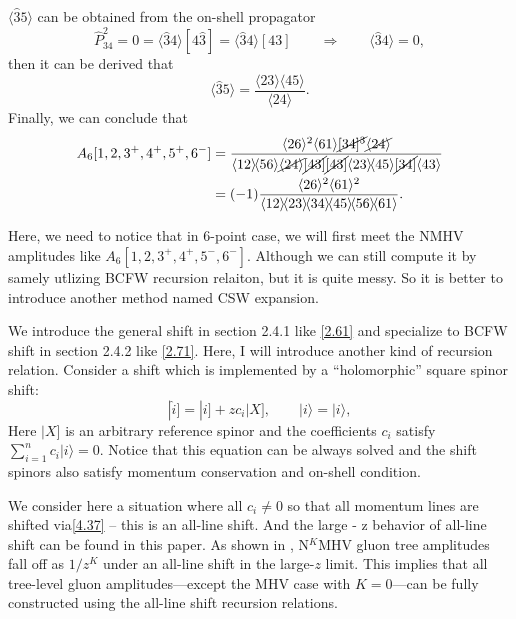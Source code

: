 \documentclass[12pt]{article}
\numberwithin{equation}{section}
\newcommand{\mdavg}[2]{\langle #1 \rangle\!\langle #2 \rangle}
\newcommand{\avg}[1]{\langle #1 \rangle}
\newcommand{\aket}[1]{|#1\rangle}
\newcommand{\sket}[1]{|#1]}
\newcommand{\cbrak}[2]{\avg{#1}\![#2]}
\begin{document}
$\avg{\hat{3}5}$ can be obtained from the on-shell propagator
\begin{equation}
    \hat{P}_{34}^2=0=\cbrak{\hat{3}4}{4\hat{3}}=\cbrak{\hat{3}4}{43}\qquad \Rightarrow\qquad \avg{\hat{3}4}=0,
\end{equation}
then it can be derived that
\begin{equation}
    \avg{\hat{3}5}=\frac{\mdavg{23}{45}}{\avg{24}}.
\end{equation}
Finally, we can conclude that
\begin{align}
    A_6[1,2,3^+,4^+,5^+,6^-]&=\frac{\avg{26}^2\avg{61}\cancel{[34]^3}\cancel{\avg{24}}}{\mdavg{12}{56}\cancel{\avg{24}}\cancel{[43]}\cancel{[43]}\mdavg{23}{45}\cancel{[34]}\avg{43}}\notag\\
    &=(-1)\frac{\avg{26}^2\avg{61}^2}{\mdavg{12}{23}\!\mdavg{34}{45}\!\mdavg{56}{61}}.
\end{align}

Here, we need to notice that in 6-point case, we will first meet the NMHV amplitudes like $A_6[1,2,3^+,4^+,5^-,6^-]$. Although we can still compute it by samely utlizing BCFW recursion relaiton, but it is quite messy. So it is better to introduce another method named CSW expansion. 

We introduce the general shift in section 2.4.1 like \eqref{2.61} and specialize to BCFW shift in section 2.4.2 like \eqref{2.71}. Here, I will introduce another kind of recursion relation. Consider a shift which is implemented by a ``holomorphic'' square spinor shift:
\begin{equation}
    \sket{\hat{i}}=\sket{i}+zc_i\sket{X},\qquad \aket{i}=\aket{i},
    \label{4.37}
\end{equation}
Here $\sket{X}$ is an arbitrary reference spinor and the coefficients $c_i$ satisfy $\sum_{i=1}^{n}c_i\aket{i}=0$. Notice that this equation can be always solved and the shift spinors also satisfy momentum conservation and on-shell condition. 

We consider here a situation where all $c_i \neq 0$ so that all momentum lines are shifted via\eqref{4.37} – this is an all-line shift. And the large - z behavior of all-line shift can be found in this paper\cite{Cohen:2010mi}.
As shown in \cite{Elvang:2008vz}, N$^{K}$MHV gluon tree amplitudes fall off as $1/z^K$ under an all-line shift in the large-$z$ limit. This implies that all tree-level gluon amplitudes---except the MHV case with $K = 0$---can be fully constructed using the all-line shift recursion relations. 
\end{document}
